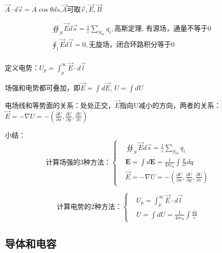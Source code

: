 \documentclass[UTF8]{../06-Physics}
\begin{document}
$ \vec{A} \cdot d \vec{s} = A \cos \theta ds $,$\vec{A}$可取$\vec{v},\vec{E},\vec{B}$ 

\begin{equation}
\begin{split}
    &\oiint _S  \vec{E}d \vec{s}  = \frac{1}{\varepsilon} \sum_{S_{in}} q_i,
    \mbox{高斯定理, 有源场，通量不等于0}\\
    &\oint _l  \vec{E}d \vec{l}  = 0,
    \mbox{无旋场，闭合环路积分等于0}\\
\end{split}
\end{equation}

定义电势：$U_p = \int _p ^ \infty \vec{E} \cdot d \vec{l} $

场强和电势都可叠加，即$\vec{E} = \int d \vec{E}$, $U = \int dU$

电场线和等势面的关系：处处正交，$\vec{E}$指向U减小的方向，两者的关系：$\vec{E} = -\nabla U = - (\frac{\partial U }{\partial x},\frac{\partial U }{\partial y},\frac{\partial U }{\partial z})$





小结：
\begin{equation}
    \mbox{计算场强的3种方法：}
    \left\{ 
        \begin{aligned}
            &\oiint _S  \vec{E}d \vec{s}  = \frac{1}{\varepsilon} \sum_{S_{in}} q_i\\
            &\boldsymbol E =  \int d \boldsymbol E
            = \frac{1}{4 \pi \varepsilon _0} \int \frac{\boldsymbol {\hat{r} } }{r^2} dq\\
            &\vec{E} = -\nabla U = - (\frac{\partial U }{\partial x},\frac{\partial U }{\partial y},\frac{\partial U }{\partial z})
        \end{aligned}
    \right.
\end{equation}

\begin{equation}
    \mbox{计算电势的2种方法：}
    \left\{ 
        \begin{aligned}
            &U_p = \int _p ^ \infty \vec{E} \cdot d \vec{l}\\
            &U = \int dU = \frac{1}{4 \pi \varepsilon _0} \int \frac{dq}{r}
        \end{aligned}
    \right.
\end{equation}


\subsection{导体和电容}
\end{document}
